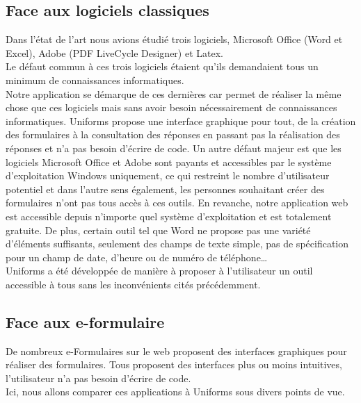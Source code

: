 \documentclass{sigplanconf}
\begin{document}
\subsection{Face aux logiciels classiques}
Dans l’état de l’art nous avions étudié trois logiciels,  Microsoft Office\cite{urlMicrosoft} (Word et Excel), Adobe\cite{urlAdobe} (PDF LiveCycle Designer) et Latex.\\
Le défaut commun à ces trois logiciels étaient qu’ils demandaient tous un minimum de connaissances informatiques.\\
Notre application se démarque de ces dernières car permet de réaliser la même chose que ces logiciels mais sans avoir besoin nécessairement de connaissances informatiques. Uniforms propose une interface graphique pour tout, de la création des formulaires à la consultation des réponses en passant pas la réalisation des réponses et n’a pas besoin d’écrire de code.
Un autre défaut majeur est que les logiciels Microsoft Office et Adobe sont payants et accessibles par le système d’exploitation Windows uniquement, ce qui restreint le nombre d’utilisateur potentiel et dans l’autre sens également, les personnes souhaitant créer des formulaires n’ont pas tous accès à ces outils. En revanche, notre application web est accessible depuis n’importe quel système d’exploitation et est totalement gratuite.
De plus, certain outil tel que Word ne propose pas une variété d’éléments suffisants, seulement des champs de texte simple, pas de spécification pour un champ de date, d’heure ou de numéro de téléphone…\\
Uniforms a été développée de manière à proposer à l’utilisateur un outil accessible à tous sans les inconvénients cités précédemment.

\subsection{Face aux e-formulaire}
De nombreux e-Formulaires sur le web proposent des interfaces graphiques pour réaliser des formulaires. Tous proposent des interfaces plus ou moins intuitives, l’utilisateur n’a pas besoin d’écrire de code. \\
Ici, nous allons comparer ces applications à Uniforms sous divers points de vue.
\end{document}
